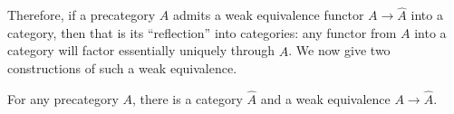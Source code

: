 \documentclass[hott-all.tex]{subfiles}
\begin{document}
%
%

%
Therefore, if a precategory $A$ admits a weak equivalence functor $A\to \widehat{A}$ into a category, then that is its ``reflection'' into categories: any functor from $A$ into a category will factor essentially uniquely through $\widehat{A}$.
We now give two constructions of such a weak equivalence.

%
%

\begin{thm}\label{thm:rezk-completion}
  For any precategory $A$, there is a category $\widehat A$ and a weak equivalence $A\to\widehat{A}$.
\end{thm}

%
\end{document}
